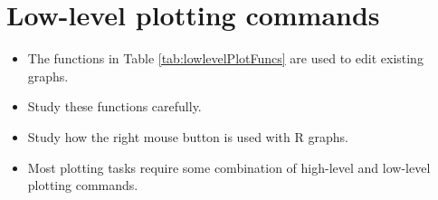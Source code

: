 \documentclass[
]{book}
\providecommand{\tightlist}{%
  \setlength{\itemsep}{0pt}\setlength{\parskip}{0pt}}
\begin{document}
\section{Low-level plotting commands}\label{low-level-plotting-commands}

\begin{itemize}
\tightlist
\item
  The functions in Table \ref{tab:lowlevelPlotFuncs} are used to edit existing graphs.\\
\item
  Study these functions carefully.
\item
  Study how the right mouse button is used with R graphs.
\item
  Most plotting tasks require some combination of high-level and low-level plotting commands.
\end{itemize}
\end{document}
